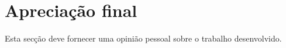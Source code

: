 \section{Aprecia\c{c}\~ao final} %
\label{sec:apreciaao}

Esta secção deve fornecer uma opinião pessoal sobre o trabalho desenvolvido.

